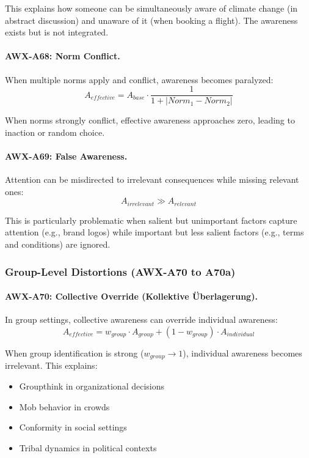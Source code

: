 This explains how someone can be simultaneously aware of climate change 
(in abstract discussion) and unaware of it (when booking a flight). 
The awareness exists but is not integrated.

\paragraph{AWX-A68: Norm Conflict.}
When multiple norms apply and conflict, awareness becomes paralyzed:
\begin{equation}
A_{effective} = A_{base} \cdot \frac{1}{1 + |Norm_1 - Norm_2|}
\end{equation}

When norms strongly conflict, effective awareness approaches zero, 
leading to inaction or random choice.

\paragraph{AWX-A69: False Awareness.}
Attention can be misdirected to irrelevant consequences while missing 
relevant ones:
\begin{equation}
A_{irrelevant} \gg A_{relevant}
\end{equation}

This is particularly problematic when salient but unimportant factors 
capture attention (e.g., brand logos) while important but less salient 
factors (e.g., terms and conditions) are ignored.

\subsubsection{Group-Level Distortions (AWX-A70 to A70a)}

\paragraph{AWX-A70: Collective Override (Kollektive Überlagerung).}
In group settings, collective awareness can override individual awareness:
\begin{equation}
A_{effective} = w_{group} \cdot A_{group} + (1 - w_{group}) \cdot A_{individual}
\end{equation}

When group identification is strong ($w_{group} \to 1$), individual 
awareness becomes irrelevant. This explains:
\begin{itemize}
    \item Groupthink in organizational decisions
    \item Mob behavior in crowds
    \item Conformity in social settings
    \item Tribal dynamics in political contexts
\end{itemize}

